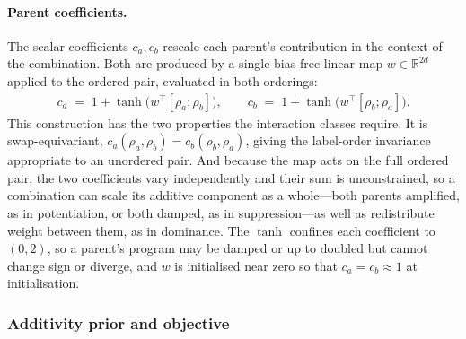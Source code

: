 \paragraph{Parent coefficients.}
The scalar coefficients $c_a, c_b$ rescale each parent's contribution in the context of the
combination. Both are produced by a single bias-free linear map $w \in \mathbb{R}^{2d}$ applied to
the ordered pair, evaluated in both orderings:
\begin{align}
  c_a \;=\; 1 + \tanh\!\big(w^\top [\rho_a;\rho_b]\big),
  \qquad
  c_b \;=\; 1 + \tanh\!\big(w^\top [\rho_b;\rho_a]\big).
  \label{eq:parent-scale}
\end{align}
This construction has the two properties the interaction classes require. It is swap-equivariant,
$c_a(\rho_a,\rho_b) = c_b(\rho_b,\rho_a)$, giving the label-order invariance appropriate to an
unordered pair. And because the map acts on the full ordered pair, the two coefficients vary
independently and their sum is unconstrained, so a combination can scale its additive component as a
whole---both parents amplified, as in potentiation, or both damped, as in suppression---as well as
redistribute weight between them, as in dominance. The $\tanh$ confines each coefficient to $(0,2)$,
so a parent's program may be damped or up to doubled but cannot change sign or diverge, and $w$ is
initialised near zero so that $c_a = c_b \approx 1$ at initialisation.

\subsubsection{Additivity prior and objective}
\label{sec:combo-elbo}

